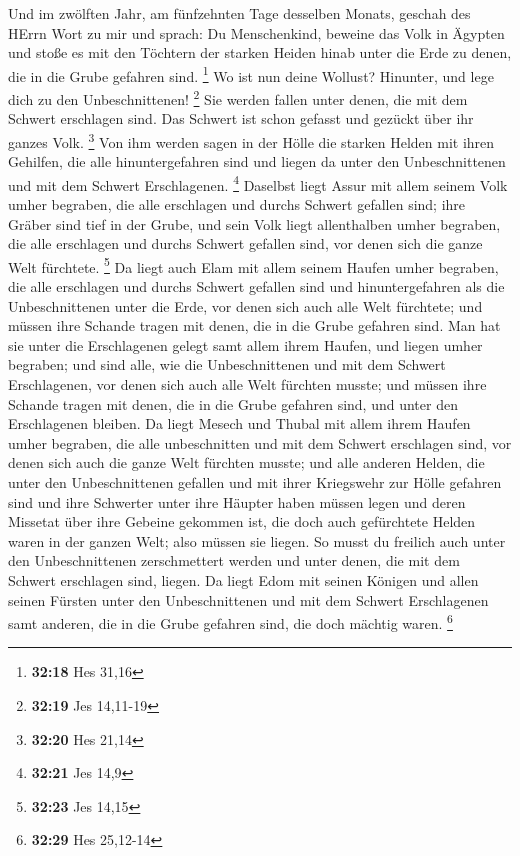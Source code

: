  Und im zwölften Jahr, am fünfzehnten Tage desselben
Monats, geschah des HErrn Wort zu mir und sprach:  Du
Menschenkind, beweine das Volk in Ägypten und stoße es mit den Töchtern
der starken Heiden hinab unter die Erde zu denen, die in die Grube
gefahren sind. \footnote{\textbf{32:18} Hes 31,16}  Wo
ist nun deine Wollust? Hinunter, und lege dich zu den Unbeschnittenen!
\footnote{\textbf{32:19} Jes 14,11-19}  Sie werden fallen
unter denen, die mit dem Schwert erschlagen sind. Das Schwert ist schon
gefasst und gezückt über ihr ganzes Volk. \footnote{\textbf{32:20} Hes
  21,14}  Von ihm werden sagen in der Hölle die starken
Helden mit ihren Gehilfen, die alle hinuntergefahren sind und liegen da
unter den Unbeschnittenen und mit dem Schwert Erschlagenen. \footnote{\textbf{32:21}
  Jes 14,9}  Daselbst liegt Assur mit allem seinem Volk
umher begraben, die alle erschlagen und durchs Schwert gefallen sind;
 ihre Gräber sind tief in der Grube, und sein Volk liegt
allenthalben umher begraben, die alle erschlagen und durchs Schwert
gefallen sind, vor denen sich die ganze Welt fürchtete. \footnote{\textbf{32:23}
  Jes 14,15}  Da liegt auch Elam mit allem seinem Haufen
umher begraben, die alle erschlagen und durchs Schwert gefallen sind und
hinuntergefahren als die Unbeschnittenen unter die Erde, vor denen sich
auch alle Welt fürchtete; und müssen ihre Schande tragen mit denen, die
in die Grube gefahren sind.  Man hat sie unter die
Erschlagenen gelegt samt allem ihrem Haufen, und liegen umher begraben;
und sind alle, wie die Unbeschnittenen und mit dem Schwert Erschlagenen,
vor denen sich auch alle Welt fürchten musste; und müssen ihre Schande
tragen mit denen, die in die Grube gefahren sind, und unter den
Erschlagenen bleiben.  Da liegt Mesech und Thubal mit
allem ihrem Haufen umher begraben, die alle unbeschnitten und mit dem
Schwert erschlagen sind, vor denen sich auch die ganze Welt fürchten
musste;  und alle anderen Helden, die unter den
Unbeschnittenen gefallen und mit ihrer Kriegswehr zur Hölle gefahren
sind und ihre Schwerter unter ihre Häupter haben müssen legen und deren
Missetat über ihre Gebeine gekommen ist, die doch auch gefürchtete
Helden waren in der ganzen Welt; also müssen sie liegen. 
So musst du freilich auch unter den Unbeschnittenen zerschmettert werden
und unter denen, die mit dem Schwert erschlagen sind, liegen.
 Da liegt Edom mit seinen Königen und allen seinen
Fürsten unter den Unbeschnittenen und mit dem Schwert Erschlagenen samt
anderen, die in die Grube gefahren sind, die doch mächtig waren.
\footnote{\textbf{32:29} Hes 25,12-14}

